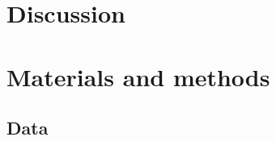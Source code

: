 \documentclass{article}
\newcommand{\beginsupplement}{%
        \setcounter{table}{0}
        \renewcommand{\thetable}{S\arabic{table}}%
        \setcounter{figure}{0}
        \renewcommand{\thefigure}{S\arabic{figure}}%
     }
\begin{document}


\section*{Discussion}







\section*{Materials and methods}

\subsection*{Data}







\end{document}
